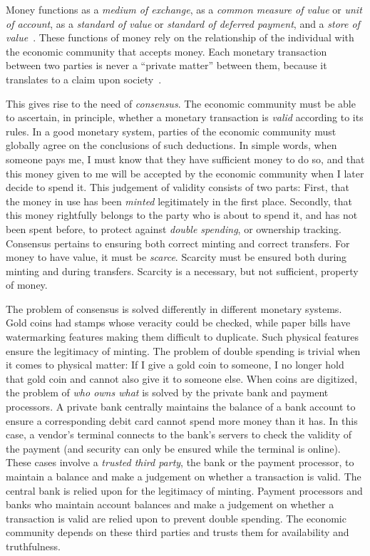 Money functions as a \emph{medium of exchange}, as a \emph{common measure of
value} or \emph{unit of account}, as a \emph{standard of value} or
\emph{standard of deferred payment}, and a \emph{store of
value}~\cite{money-mechanism}. These functions of money rely on the relationship
of the individual with the economic community that accepts money. Each monetary
transaction between two parties is never a ``private matter'' between them,
because it translates to a claim upon society~\cite{philosophy-of-money}.

This gives rise to the need of \emph{consensus}. The economic community must be
able to ascertain, in principle, whether a monetary transaction is \emph{valid}
according to its rules. In a good monetary system, parties of the economic
community must globally agree on the conclusions of such deductions. In simple
words, when someone pays me, I must know that they have sufficient money to do
so, and that this money given to me will be accepted by the economic community
when I later decide to spend it. This judgement of validity consists of two
parts: First, that the money in use has been \emph{minted} legitimately in the first
place.
Secondly, that this money rightfully belongs to the party who is about to
spend it, and has not been spent before, to protect against \emph{double spending},
or {ownership tracking}.
Consensus pertains to ensuring both correct minting and correct transfers.
For money to have value, it must be \emph{scarce}. Scarcity must be ensured
both during minting and during transfers.
Scarcity is a necessary, but not sufficient,
property of money.

The problem of consensus is solved differently in different monetary systems. Gold
coins had stamps whose veracity could be checked, while paper bills have watermarking
features making them difficult to duplicate. Such physical features ensure the
legitimacy of minting. The problem of double spending is trivial when it comes to
physical matter: If I give a
gold coin to someone, I no longer hold that gold coin and cannot also give it to
someone else. When coins are digitized, the problem of \emph{who owns what}
is solved by the private bank and payment processors.
A private bank centrally maintains the balance of a bank account to ensure a
corresponding debit card cannot spend more money than it has. In this case, a
vendor's terminal connects to the bank's servers to check the validity of the
payment (and security can only be ensured while the terminal is online). These
cases involve a \emph{trusted third party}, the
bank or the payment processor, to maintain a balance and make a judgement on
whether a transaction is valid. The central bank is relied upon for the
legitimacy of minting. Payment processors and banks who maintain account
balances and make a judgement on whether a transaction is valid are relied upon
to prevent double spending. The economic community depends on these third
parties and trusts them for availability and truthfulness.

